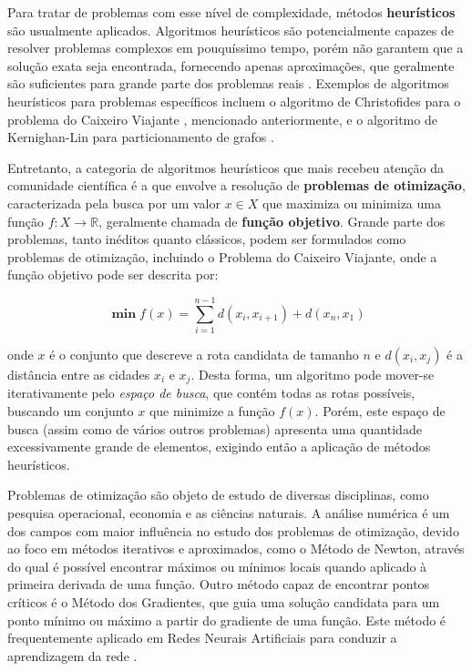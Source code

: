 \documentclass[12pt]{article}
\begin{document}
Para tratar de problemas com esse nível de complexidade, métodos \textbf{heurísticos} são usualmente aplicados. Algoritmos heurísticos são potencialmente capazes de resolver problemas complexos em pouquíssimo tempo, porém não garantem que a solução exata seja encontrada, fornecendo apenas aproximações, que geralmente são suficientes para grande parte dos problemas reais \cite{Kokash2005}. Exemplos de algoritmos heurísticos para problemas específicos incluem o algoritmo de Christofides para o problema do Caixeiro Viajante \cite{Christofides1976}, mencionado anteriormente, e o algoritmo de Kernighan-Lin para particionamento de grafos \cite{Kernighan1970}.

Entretanto, a categoria de algoritmos heurísticos que mais recebeu atenção da comunidade científica é a que envolve a resolução de \textbf{problemas de otimização}, caracterizada pela busca por um valor $x \in X$ que maximiza ou minimiza uma função $f: X \rightarrow \mathbb{R}$, geralmente chamada de \textbf{função objetivo}. Grande parte dos problemas, tanto inéditos quanto clássicos, podem ser formulados como problemas de otimização, incluindo o Problema do Caixeiro Viajante, onde a função objetivo pode ser descrita por:

\begin{equation} \label{eq:tsp}
    \mathop{\boldsymbol\min} f(x) = \sum_{i = 1}^{n - 1} d(x_{i}, x_{i + 1}) + d(x_{n}, x_{1})
\end{equation}

\noindent onde $x$ é o conjunto que descreve a rota candidata de tamanho $n$ e $d(x_{i}, x_{j})$ é a distância entre as cidades $x_{i}$ e $x_{j}$. Desta forma, um algoritmo pode mover-se iterativamente pelo \textit{espaço de busca}, que contém todas as rotas possíveis, buscando um conjunto $x$ que minimize a função $f(x)$. Porém, este espaço de busca (assim como de vários outros problemas) apresenta uma quantidade excessivamente grande de elementos, exigindo então a aplicação de métodos heurísticos.

Problemas de otimização são objeto de estudo de diversas disciplinas, como pesquisa operacional, economia e as ciências naturais. A análise numérica é um dos campos com maior influência no estudo dos problemas de otimização, devido ao foco em métodos iterativos e aproximados, como o Método de Newton, através do qual é possível encontrar máximos ou mínimos locais quando aplicado à primeira derivada de uma função. Outro método capaz de encontrar pontos críticos é o Método dos Gradientes, que guia uma solução candidata para um ponto mínimo ou máximo a partir do gradiente de uma função. Este método é frequentemente aplicado em Redes Neurais Artificiais para conduzir a aprendizagem da rede \cite{Haykin1998}.
\end{document}
